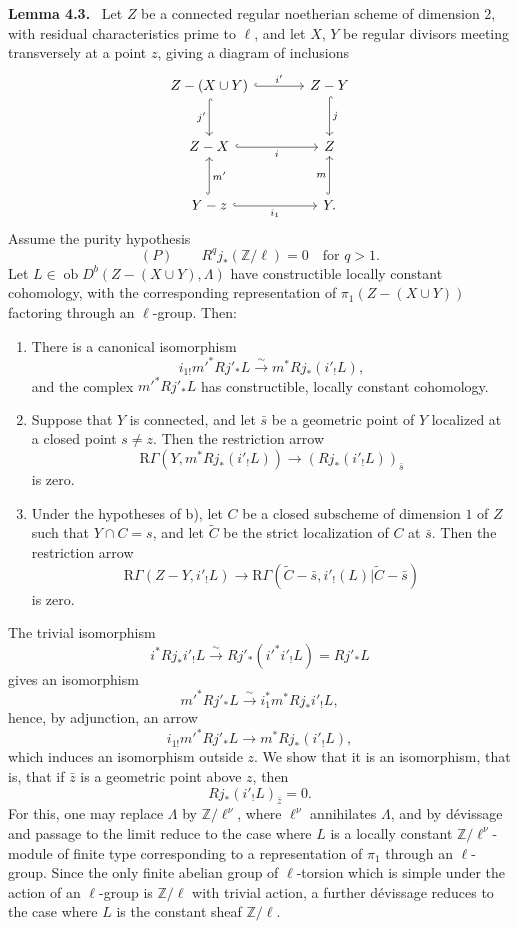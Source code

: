 \documentclass[11pt]{article}
\newenvironment{statement}[1]{\par\medskip\noindent\textbf{#1.}\ }{\par\medskip}
\providecommand{\Ob}{\operatorname{ob}}
\providecommand{\Ob}{\operatorname{ob}}
\providecommand{\Ob}{\operatorname{Ob}}
\providecommand{\Ob}{\operatorname{ob}}
\providecommand{\Ob}{\operatorname{Ob}}
\begin{document}
\begin{statement}{Lemma 4.3}
Let $Z$ be a connected regular noetherian scheme of dimension $2$, with residual characteristics prime to $\ell$, and let $X$, $Y$ be regular divisors meeting transversely at a point $z$, giving a diagram of inclusions
\[
\begin{tikzcd}[column sep=large,row sep=large]
Z-(X\cup Y) \arrow[r,hook,"i'"] \arrow[d,hook,"j'"'] & Z-Y \arrow[d,hook,"j"]\\
Z-X \arrow[r,hook,"i"'] & Z\\
Y-z \arrow[r,hook,"i_1"'] \arrow[u,hook,"m'"'] & Y \arrow[u,hook,"m"] .
\end{tikzcd}
\]
Assume the purity hypothesis
\[
(P)\qquad R^qj_*(\mathbb Z/\ell)=0\quad\text{for }q>1.
\]
Let $L\in\Ob D^b(Z-(X\cup Y),\Lambda)$ have constructible locally constant cohomology, with the corresponding representation of $\pi_1(Z-(X\cup Y))$ factoring through an $\ell$-group. Then:
\begin{enumerate}[label=\alph*)]
\item There is a canonical isomorphism
\[
i_{1!}m'^*Rj'_*L\xrightarrow{\sim} m^*Rj_*(i'_!L),
\]
and the complex $m'^*Rj'_*L$ has constructible, locally constant cohomology.
\item Suppose that $Y$ is connected, and let $\bar s$ be a geometric point of $Y$ localized at a closed point $s\ne z$. Then the restriction arrow
\begin{equation}
\mathrm R\Gamma(Y,m^*Rj_*(i'_!L))\longrightarrow (Rj_*(i'_!L))_{\bar s}
\tag{4.3.1}
\end{equation}
is zero.
\item Under the hypotheses of b), let $C$ be a closed subscheme of dimension $1$ of $Z$ such that $Y\cap C=s$, and let $\widetilde C$ be the strict localization of $C$ at $\bar s$. Then the restriction arrow
\begin{equation}
\mathrm R\Gamma(Z-Y,i'_!L)
\longrightarrow
\mathrm R\Gamma(\widetilde C-\bar s,i'_!(L)|\widetilde C-\bar s)
\tag{4.3.2}
\end{equation}
is zero.
\end{enumerate}
\end{statement}

The trivial isomorphism
\[
i^*Rj_*i'_!L\xrightarrow{\sim}Rj'_*(i'^*i'_!L)=Rj'_*L
\]
gives an isomorphism
\[
m'^*Rj'_*L\xrightarrow{\sim} i_1^*m^*Rj_*i'_!L,
\]
hence, by adjunction, an arrow
\[
i_{1!}m'^*Rj'_*L\longrightarrow m^*Rj_*(i'_!L),
\]
which induces an isomorphism outside $z$. We show that it is an isomorphism, that is, that if $\bar z$ is a geometric point above $z$, then
\[
Rj_*(i'_!L)_{\bar z}=0.
\]
For this, one may replace $\Lambda$ by $\mathbb Z/\ell^\nu$, where $\ell^\nu$ annihilates $\Lambda$, and by dévissage and passage to the limit reduce to the case where $L$ is a locally constant $\mathbb Z/\ell^\nu$-module of finite type corresponding to a representation of $\pi_1$ through an $\ell$-group. Since the only finite abelian group of $\ell$-torsion which is simple under the action of an $\ell$-group is $\mathbb Z/\ell$ with trivial action, a further dévissage reduces to the case where $L$ is the constant sheaf $\mathbb Z/\ell$.
\end{document}

